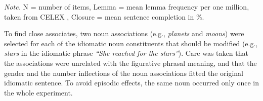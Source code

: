 \begin{table}[]
\caption{\textit{Idiomatic Sentences and Stimulus Characteristics of the Idiomatic, Modified, and Unrelated Noun Constituents in Experiment 1.}}
\label{tab:stimulus}
\footnotesize{\textit{Note.} N = number of items, Lemma = mean lemma frequency per one million, taken from CELEX \citep{baayen:1993}, Closure = mean sentence completion in \%.}
\end{table}


To find close associates, two noun associations (e.g., \textit{planets} and \textit{moons}) were selected for each of the idiomatic noun constituents that should be modified (e.g., \textit{stars} in the idiomatic phrase \textit{``She reached for the stars''}). Care was taken that the associations were unrelated with the figurative phrasal meaning, and that the gender and the number inflections of the noun associations fitted the original idiomatic sentence. To avoid episodic effects, the same noun occurred only once in the whole experiment.

